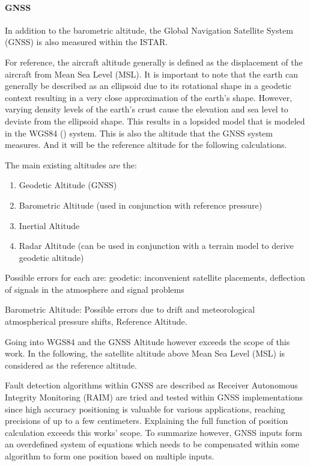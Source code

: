 \paragraph{GNSS}
In addition to the barometric altitude, the Global Navigation Satellite System (GNSS) is also measured within the ISTAR.

For reference, the aircraft altitude generally is defined as the displacement of the aircraft from Mean Sea Level (MSL). It is important to note that the earth can generally be described as an ellipsoid due to its rotational shape in a geodetic context resulting in a very close approximation of the earth's shape. However, varying density levels of the earth's crust cause the elevation and sea level to deviate from the ellipsoid shape. This results in a lopsided model that is modeled in the WGS84 (\cite{schwarz_wgs_1998}) system. This is also the altitude that the GNSS system measures. And it will be the reference altitude for the following calculations.

The main existing altitudes are the:
\begin{enumerate}
    \item Geodetic Altitude (GNSS)
    \item Barometric Altitude (used in conjunction with reference pressure)
    \item Inertial Altitude
    \item Radar Altitude (can be used in conjunction with a terrain model to derive geodetic altitude)
\end{enumerate}


Possible errors for each are: geodetic: inconvenient satellite placements, deflection of signals in the atmosphere and signal problems


Barometric Altitude: Possible errors due to drift and meteorological atmospherical pressure shifts, Reference Altitude.

Going into WGS84 and the GNSS Altitude however exceeds the scope of this work. In the following, the satellite altitude above Mean Sea Level (MSL) is considered as the reference altitude.


Fault detection algorithms within GNSS are described as Receiver Autonomous Integrity Monitoring (RAIM) are tried and tested within GNSS implementations since high accuracy positioning is valuable for various applications, reaching precisions of up to a few centimeters. Explaining the full function of position calculation exceeds this works' scope. To summarize however, GNSS inputs form an overdefined system of equations which needs to be compensated within some algorithm to form one position based on multiple inputs.


